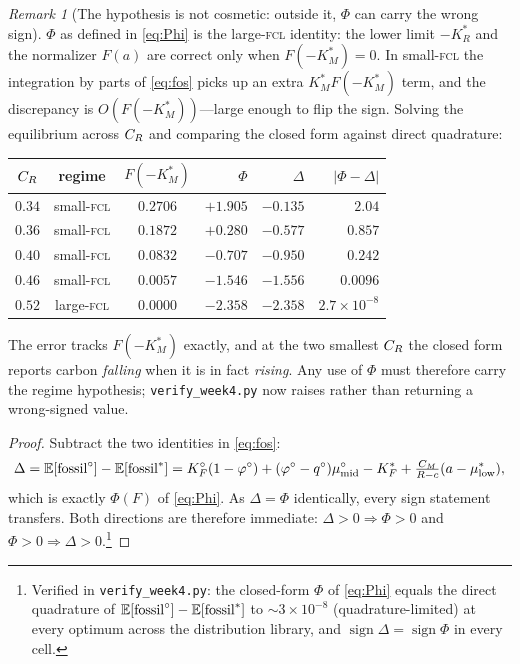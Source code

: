 \documentclass[11pt,reqno]{amsart}
\theoremstyle{plain}
\theoremstyle{definition}
\theoremstyle{remark}
\newtheorem{remark}{Remark}
\theoremstyle{remark}\newtheorem{observation}{Observation}
\newcommand{\KRs}{K_R^{*}}\newcommand{\KFs}{K_F^{*}}\newcommand{\KMs}{K_M^{*}}
\newcommand{\E}{\mathbb{E}}\newcommand{\PP}{\mathbb{P}}\newcommand{\eqdef}{\vcentcolon=}
\newcommand{\mustar}{\mu^{*}_{\mathrm{low}}}\newcommand{\mumid}{\mu^{\circ}_{\mathrm{mid}}}
\newcommand{\phio}{\varphi^{\circ}}\newcommand{\qo}{q^{\circ}}
\begin{document}
\begin{remark}[The hypothesis is not cosmetic: outside it, $\Phi$ can carry the wrong sign]
\label{rem:regime}
$\Phi$ as defined in \eqref{eq:Phi} is the large-\textsc{fcl} identity: the lower limit
$-\KRs$ and the normalizer $F(a)$ are correct only when $F(-\KMs)=0$. In small-\textsc{fcl}
the integration by parts of \eqref{eq:fos} picks up an extra $\KMs F(-\KMs)$ term, and the
discrepancy is $O(F(-\KMs))$---large enough to flip the sign. Solving the equilibrium
across $C_R$ and comparing the closed form against direct quadrature:
\begin{center}\small
\begin{tabular}{cccrrr}
\toprule
$C_R$ & regime & $F(-\KMs)$ & $\Phi$ & $\Delta$ & $|\Phi-\Delta|$\\
\midrule
$0.34$ & small-\textsc{fcl} & $0.2706$ & $+1.905$ & $-0.135$ & $2.04$\\
$0.36$ & small-\textsc{fcl} & $0.1872$ & $+0.280$ & $-0.577$ & $0.857$\\
$0.40$ & small-\textsc{fcl} & $0.0832$ & $-0.707$ & $-0.950$ & $0.242$\\
$0.46$ & small-\textsc{fcl} & $0.0057$ & $-1.546$ & $-1.556$ & $0.0096$\\
$0.52$ & large-\textsc{fcl} & $0.0000$ & $-2.358$ & $-2.358$ & $2.7\times10^{-8}$\\
\bottomrule
\end{tabular}
\end{center}
The error tracks $F(-\KMs)$ exactly, and at the two smallest $C_R$ the closed form reports
carbon \emph{falling} when it is in fact \emph{rising}. Any use of $\Phi$ must therefore
carry the regime hypothesis; \texttt{verify\_week4.py} now raises rather than returning a
wrong-signed value.
\end{remark}

\begin{proof}
Subtract the two identities in \eqref{eq:fos}:
\[
  \Delta=\E[\fossil^{\circ}]-\E[\fossil^{*}]
  =\KFo(1-\phio)+(\phio-\qo)\mumid-\KFs+\tfrac{\CM}{R-c}(a-\mustar),
\]
which is exactly $\Phi(F)$ of \eqref{eq:Phi}. As $\Delta=\Phi$ identically, every sign
statement transfers. Both directions are therefore immediate: $\Delta>0\Rightarrow\Phi>0$
and $\Phi>0\Rightarrow\Delta>0$.\footnote{Verified in \texttt{verify\_week4.py}: the
closed-form $\Phi$ of \eqref{eq:Phi} equals the direct quadrature of
$\E[\fossil^{\circ}]-\E[\fossil^{*}]$ to $\sim3\times10^{-8}$ (quadrature-limited) at every optimum across the
distribution library, and $\operatorname{sign}\Delta=\operatorname{sign}\Phi$ in every
cell.}
\end{proof}
\end{document}

